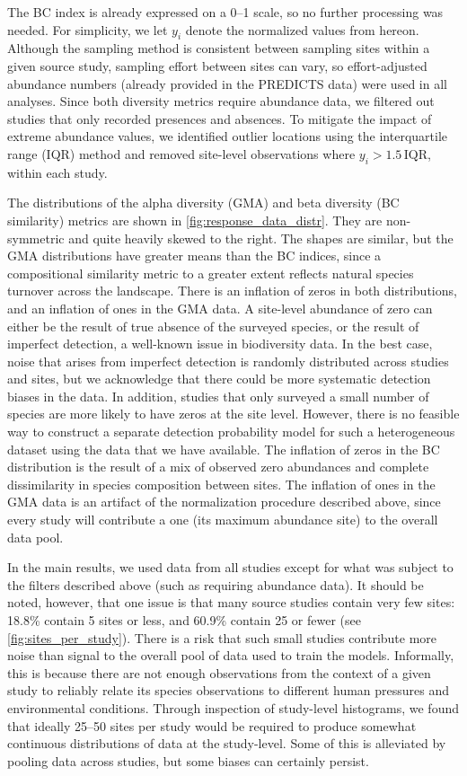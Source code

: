 The BC index is already expressed on a 0--1 scale, so no further processing was needed. For simplicity, we let $y_i$ denote the normalized values from hereon. Although the sampling method is consistent between sampling sites within a given source study, sampling effort between sites can vary, so effort-adjusted abundance numbers (already provided in the PREDICTS data) were used in all analyses. Since both diversity metrics require abundance data, we filtered out studies that only recorded presences and absences. To mitigate the impact of extreme abundance values, we identified outlier locations using the interquartile range (IQR) method and removed site-level observations where $y_i > 1.5 \,\text{IQR}$, within each study.

The distributions of the alpha diversity (GMA) and beta diversity (BC similarity) metrics are shown in \autoref{fig:response_data_distr}. They are non-symmetric and quite heavily skewed to the right. The shapes are similar, but the GMA distributions have greater means than the BC indices, since a compositional similarity metric to a greater extent reflects natural species turnover across the landscape. There is an inflation of zeros in both distributions, and an inflation of ones in the GMA data. A site-level abundance of zero can either be the result of true absence of the surveyed species, or the result of imperfect detection, a well-known issue in biodiversity data. In the best case, noise that arises from imperfect detection is randomly distributed across studies and sites, but we acknowledge that there could be more systematic detection biases in the data. In addition, studies that only surveyed a small number of species are more likely to have zeros at the site level. However, there is no feasible way to construct a separate detection probability model \cite{dorazio2016,wu2015} for such a heterogeneous dataset using the data that we have available. The inflation of zeros in the BC distribution is the result of a mix of observed zero abundances and complete dissimilarity in species composition between sites. The inflation of ones in the GMA data is an artifact of the normalization procedure described above, since every study will contribute a one (its maximum abundance site) to the overall data pool.

In the main results, we used data from all studies except for what was subject to the filters described above (such as requiring abundance data). It should be noted, however, that one issue is that many source studies contain very few sites: 18.8\% contain 5 sites or less, and 60.9\% contain 25 or fewer (see \autoref{fig:sites_per_study}). There is a risk that such small studies contribute more noise than signal to the overall pool of data used to train the models. Informally, this is because there are not enough observations from the context of a given study to reliably relate its species observations to different human pressures and environmental conditions. Through inspection of study-level histograms, we found that ideally 25--50 sites per study would be required to produce somewhat continuous distributions of data at the study-level. Some of this is alleviated by pooling data across studies, but some biases can certainly persist.

